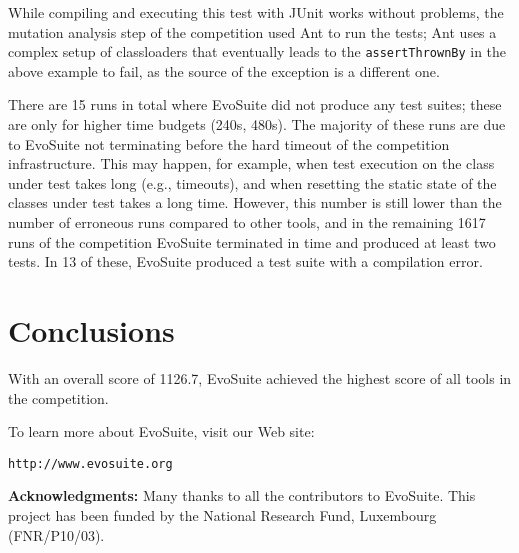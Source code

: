 \documentclass{sig-alternate}
\newcommand{\EVOSUITE}{{\sc EvoSuite}\xspace}
\begin{document}
While compiling and executing this test with JUnit works without
problems, the mutation analysis step of the competition used Ant to
run the tests; Ant uses a complex setup of classloaders that
eventually leads to the \texttt{assertThrownBy} in the above example
to fail, as the source of the exception is a different one.

There are 15 runs in total where \EVOSUITE did not produce any test
suites; these are only for higher time budgets (240s, 480s). The
majority of these runs are due to \EVOSUITE not terminating before the
hard timeout of the competition infrastructure. This may happen, for
example, when test execution on the class under test takes long (e.g.,
timeouts), and when resetting the static state of the classes under
test takes a long time. However, this number is still lower than the
number of erroneous runs compared to other tools, and in the remaining
1617 runs of the competition \EVOSUITE terminated in time and produced
at least two tests. In 13 of these, \EVOSUITE produced a test suite
with a compilation error.

\section{Conclusions}

With an overall score of 1126.7, \EVOSUITE achieved the highest score
of all tools in the competition. 


To learn more about \EVOSUITE, visit our Web site:
\begin{center}
\texttt{http://www.evosuite.org}
\end{center}



\textbf{Acknowledgments:} Many thanks to all the contributors to \EVOSUITE.
This project has been funded by 
the National Research Fund, Luxembourg (FNR/P10/03).





\balance
\end{document}

